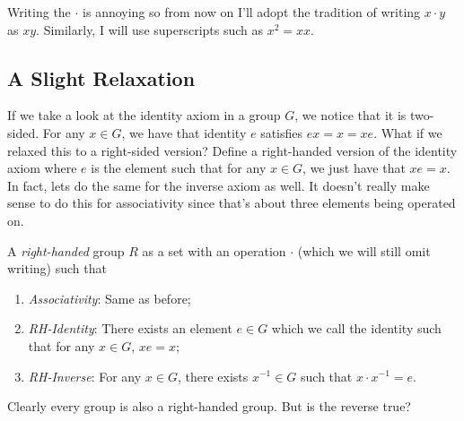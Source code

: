 \documentclass{article}
\begin{document}
Writing the $\cdot$ is annoying so from now on I'll adopt the tradition of writing $x \cdot y$ as $xy$.
Similarly, I will use superscripts such as $x^{2} = xx$.

\subsection*{A Slight Relaxation}

If we take a look at the identity axiom in a group $G$, we notice that it is two-sided.
For any $x \in G$, we have that identity $e$ satisfies $ex = x = xe$.
What if we relaxed this to a right-sided version?
Define a right-handed version of the identity axiom where $e$ is the element such that for any $x \in G$, we just have that $xe = x$.
In fact, lets do the same for the inverse axiom as well.
It doesn't really make sense to do this for associativity since that's about three elements being operated on.

\begin{defn}\label{defn:rh-grp}
  A \emph{right-handed} group $R$ as a set with an operation $\cdot$ (which we will still omit writing) such that
  \begin{enumerate}
  \item \emph{Associativity}: Same as before;
  \item \emph{RH-Identity}: There exists an element $e \in G$ which we call the identity such that for any $x \in G$, $xe = x$;
  \item \emph{RH-Inverse}: For any $x \in G$, there exists $x^{-1} \in G$ such that $x \cdot x^{-1} = e$.
  \end{enumerate}
\end{defn}
Clearly every group is also a right-handed group.
But is the reverse true?
\end{document}
